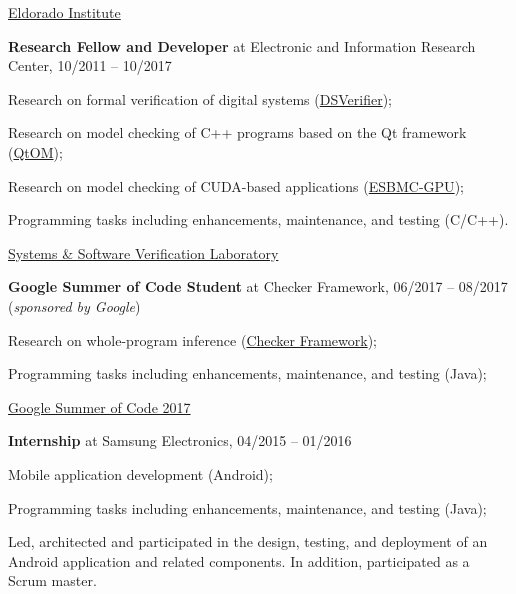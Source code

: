 \documentclass[letterpaper]{article}
\renewenvironment{itemize}{
  \begin{list}{}{
    \setlength{\leftmargin}{1.5em}
  }
}{
  \end{list}
}
\begin{document}
\begin{enumerate}
\begin{itemize}
        \item{\textendash} \href{http://eldorado.org.br/}{Eldorado Institute}
      \end{itemize}
     \item{{\bf Research Fellow and Developer} at Electronic and Information Research Center, 10/2011 -- 10/2017}
      \begin{itemize}
        \item{\textendash} {Research on formal verification of digital systems (\href{http://www.dsverifier.org/}{DSVerifier});}
        \item{\textendash} {Research on model checking of C++ programs based on the Qt framework (\href{http://www.esbmc/qtom/}{QtOM});}
        \item{\textendash} {Research on model checking of CUDA-based applications (\href{http://www.esbmc/gpu/}{ESBMC-GPU});}
        \item{\textendash} {Programming tasks including enhancements, maintenance, and testing (C/C++).}
        \item{\textendash} \href{https://ssvlab.github.io}{Systems \& Software Verification Laboratory}
      \end{itemize}
      \item{{\bf Google Summer of Code Student} at Checker Framework, 06/2017 -- 08/2017 ({\it sponsored by Google})} 
      \begin{itemize}
        \item{\textendash} {Research on whole-program inference (\href{https://checkerframework.org/}{Checker Framework});}
        \item{\textendash} {Programming tasks including enhancements, maintenance, and testing (Java);}
        \item{\textendash} \href{https://summerofcode.withgoogle.com/archive/2017/projects/6689181245898752/}{Google Summer of Code 2017}
      \end{itemize}
      \item{{\bf Internship} at Samsung Electronics, 04/2015 -- 01/2016}
      \begin{itemize}
        \item{\textendash} {Mobile application development (Android);}
        \item{\textendash} {Programming tasks including enhancements, maintenance, and testing (Java);}
        \item{\textendash} {Led, architected and participated in the design, testing, and deployment of an Android application and related components. In addition, participated as a Scrum master.}

\end{itemize}
\end{enumerate}
\end{document}
